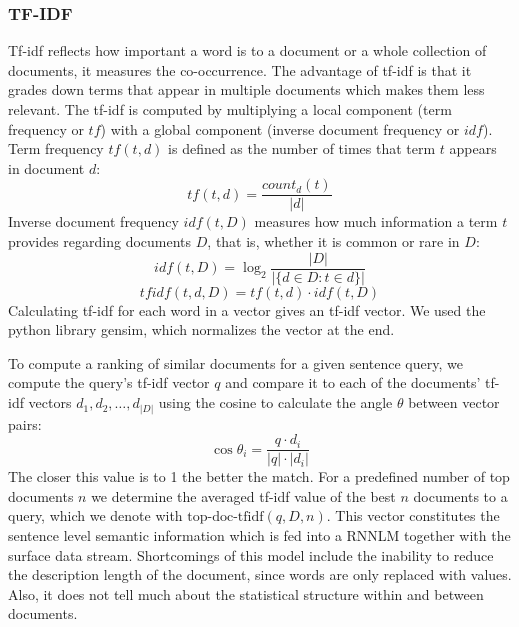 \documentclass[a4paper]{article}
\begin{document}
\subsubsection{TF-IDF}
Tf-idf \cite{salton1986introduction} reflects how important a word is to a document or a whole collection of documents, it measures the co-occurrence. The advantage of tf-idf is that it grades down terms that appear in multiple documents which makes them less relevant.
The tf-idf is computed by multiplying a local component (term frequency or $tf$) with a global component (inverse document frequency or $idf$). Term frequency $tf(t, d)$ is defined as the number of times that term $t$ appears in document $d$:
\begin{equation} 
tf(t,d)=\dfrac{count_d(t)}{|d|}
\end{equation}
Inverse document frequency $idf(t, D)$ measures how much information a term $t$ provides regarding documents $D$, that is, whether it is common or rare in $D$:
\begin{equation}
idf(t,D)= \log_2{ \dfrac{|D|}{|\{d \in D: t \in d\}|}}
\end{equation}
\begin{equation}
tfidf(t, d, D) = tf(t,d) \cdot idf(t,D)
\end{equation}
Calculating tf-idf for each word in a vector gives an tf-idf vector. We used the python library gensim, which normalizes the vector at the end.

To compute a ranking of similar documents for a given sentence query, we compute the query's tf-idf vector $q$ and compare it to each of the documents' tf-idf vectors $d_1, d_2, \ldots, d_{|D|}$ using the cosine to calculate the angle $\theta$ between vector pairs:
\begin{equation} \label{eq:cos-similar}
\cos \theta_i = \dfrac{q \cdot d_i}{|q| \cdot |d_i|}
\end{equation} 
The closer this value is to 1 the better the match.
For a predefined number of top documents $n$ we determine the averaged tf-idf value of the best $n$ documents to a query, which we denote with $\text{top-doc-tfidf}(q, D, n)$.
This vector constitutes the sentence level semantic information which is fed into a RNNLM together with the surface data stream.
Shortcomings of this model include the inability to reduce the description length of the document, since words are only replaced with values. Also, it does not tell much about the statistical structure within and between documents.
\end{document}

